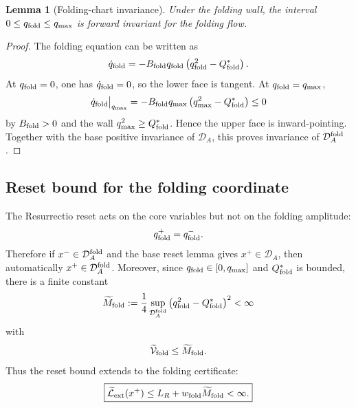 \documentclass[11pt,a4paper]{article}
\theoremstyle{plain}
\newtheorem{lemma}{Lemma}
\theoremstyle{definition}
\theoremstyle{remark}
\begin{document}
\begin{lemma}[Folding-chart invariance]
Under the folding wall, the interval $0\le q_{\rm fold}\le q_{\max}$ is forward
invariant for the folding flow.
\end{lemma}
\begin{proof}
The folding equation can be written as
\begin{equation}
  \dot q_{\rm fold}
  =-B_{\rm fold}q_{\rm fold}
  \left(q_{\rm fold}^{2}-Q_{\rm fold}^{*}\right).
\end{equation}
At $q_{\rm fold}=0$, one has $\dot q_{\rm fold}=0$, so the lower face is tangent.
At $q_{\rm fold}=q_{\max}$,
\begin{equation}
  \dot q_{\rm fold}\big|_{q_{\max}}
  =-B_{\rm fold}q_{\max}
  \left(q_{\max}^{2}-Q_{\rm fold}^{*}\right)\le0
\end{equation}
by $B_{\rm fold}>0$ and the wall $q_{\max}^2\ge Q_{\rm fold}^{*}$. Hence the upper
face is inward-pointing. Together with the base positive invariance of
$\mathcal D_A$, this proves invariance of $\mathcal D_A^{\rm fold}$.
\end{proof}

\subsection{Reset bound for the folding coordinate}
The Resurrectio reset acts on the core variables but not on the folding
amplitude:
\begin{equation}
  q_{\rm fold}^{+}=q_{\rm fold}^{-}.
\end{equation}
Therefore if $x^{-}\in\mathcal D_A^{\rm fold}$ and the base reset lemma gives
$x^{+}\in\mathcal D_A$, then automatically $x^{+}\in\mathcal D_A^{\rm fold}$.
Moreover, since $q_{\rm fold}\in[0,q_{\max}]$ and $Q_{\rm fold}^{*}$ is bounded,
there is a finite constant
\begin{equation}
  \widetilde M_{\rm fold}
  :=\frac14\sup_{\mathcal D_A^{\rm fold}}
  \left(q_{\rm fold}^{2}-Q_{\rm fold}^{*}\right)^2<\infty
\end{equation}
with
\begin{equation}
  \widetilde{\mathcal V}_{\rm fold}\le\widetilde M_{\rm fold}.
\end{equation}
Thus the reset bound extends to the folding certificate:
\begin{equation}
  \boxed{
  \widetilde{\mathcal L}_{\rm ext}(x^+)
  \le L_R+w_{\rm fold}\widetilde M_{\rm fold}<\infty.}
\end{equation}
\end{document}
